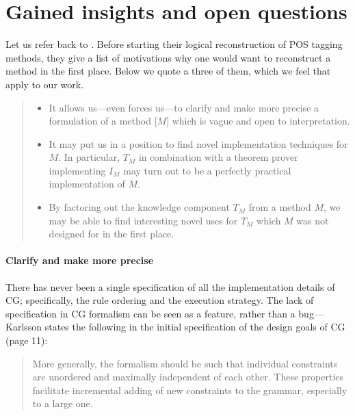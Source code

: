 \section{Gained insights and open questions}

Let us refer back to \cite{lager_nivre01}. 
Before starting their logical reconstruction of POS tagging methods, 
they give a list of motivations why one would want to reconstruct a method in the first place.
Below we quote a three of them, which we feel that apply to our work.

\begin{quote}
\begin{itemize}
\item It allows us---even forces us---to clarify and make more precise a formulation of a method [$M$] which is vague and open to interpretation.
\item It may put us in a position to find novel implementation techniques for $M$. 
In particular, $T_M$ in combination with a theorem prover implementing $I_M$ may turn out to be a perfectly practical implementation of $M$.
\item By factoring out the knowledge component $T_M$ from a method $M$, 
we may be able to find interesting novel uses for $T_M$ which $M$ was not designed for in the first place.
\end{itemize}
\end{quote}


\paragraph{Clarify and make more precise} %

There has never been a single specification of all the implementation details of CG; specifically, the rule ordering and the execution strategy.
The lack of specification in CG formalism can be seen as a feature, rather than a bug---Karlsson states the following in the initial specification of the design goals of CG \cite{karlsson1995constraint} (page 11):

\begin{quote}
More generally, the formalism should be such that individual constraints are unordered and maximally independent of each other. These properties facilitate incremental adding of new constraints to the grammar, especially to a large one.
\end{quote}

